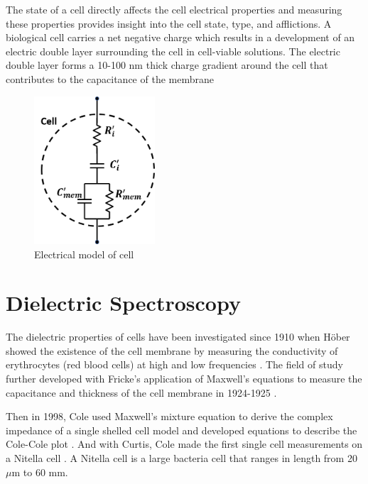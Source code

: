 \par The state of a cell directly affects the cell electrical properties and measuring these properties provides insight into the cell state, type, and afflictions. A biological cell carries a net negative charge which results in a development of an electric double layer surrounding the cell in cell-viable solutions. The electric double layer forms a 10-100 nm thick charge gradient around the cell that contributes to the capacitance of the membrane \cite{}

\begin{figure}
    \centering
    \includegraphics[width=0.4\textwidth]{images/completeCellCircuit.png}
    \caption{Electrical model of cell}
    \label{fig:electric_model_cell}
\end{figure}
 
 \section{Dielectric Spectroscopy}

 
 \par The dielectric properties of cells have been investigated since 1910 when H\"{o}ber showed the existence of the cell membrane by measuring the conductivity of erythrocytes (red blood cells) at high and low frequencies \cite{hober_r_methode_1910}. The field of study further developed with Fricke's application of Maxwell's equations to measure the capacitance and thickness of the cell membrane in 1924-1925 \cite{james_clerk_maxwell_treatise_1892, fricke_h_mathematical_1924, fricke_h_electric_1924, fricke_h_electric_1931}. 
 
 \par Then in 1998, Cole used Maxwell's mixture equation to derive the complex impedance of a single shelled cell model and developed equations to describe the Cole-Cole plot \cite{cole_electric_1928}. And with Curtis, Cole made the first single cell measurements on a Nitella cell \cite{curtis_transverse_1937}. A Nitella cell is a large bacteria cell that ranges in length from 20 $\mu$m to 60 mm. 
 
